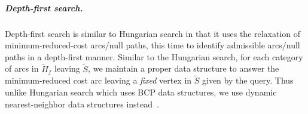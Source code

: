 \documentclass[a4paper,UKenglish]{socg-lipics-v2018}
\makeatletter
\def\polylog{\mathop{\mathrm{polylog}}}
\theoremstyle{plain}
\numberwithin{figure}{section}
\renewcommand{\paragraph}{\subparagraph}
\def\n@te#1{\textsf{\boldmath \textbf{$\langle\!\langle$#1$\rangle\!\rangle$}}\leavevmode}
\def\note#1{\textcolor{red}{\n@te{#1}}}
\renewcommand{\note}[1]{} %
\makeatother
\begin{document}
%


\paragraph{Depth-first search.}
Depth-first search is similar to Hungarian search in that it
uses the relaxation of minimum-reduced-cost arcs/null paths, this time to
identify admissible arcs/null paths in a depth-first manner.
%
Similar to the Hungarian search, for each category of arcs in $\tilde{H}_f$
leaving $\tilde{S}$, we maintain a proper data structure to answer the
minimum-reduced cost arc leaving a \emph{fixed} vertex in $\tilde{S}$ given
by the query.
Thus unlike Hungarian search which uses BCP data structures, we use dynamic
nearest-neighbor data structures instead~\cite{KMRSS17}.
%
\end{document}
